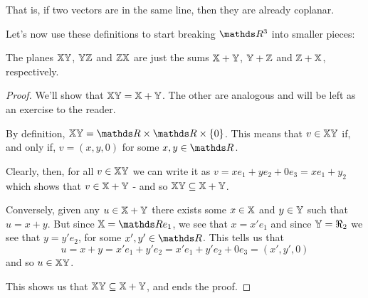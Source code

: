 That is, if two vectors are in the same line, then they are already coplanar.

Let's now use these definitions to start breaking $\R^3$ into smaller pieces:

\begin{lemma}
	The planes $\mathbb{XY}$, $\mathbb{YZ}$ and $\mathbb{ZX}$ are just the sums $\mathbb{X+Y}$, $\mathbb{Y+Z}$ and $\mathbb{Z+X}$, respectively.
\end{lemma}
\begin{proof}
	We'll show that $\mathbb{XY=X+Y}$. The other are analogous and will be left as an exercise to the reader.
	
	By definition, $\mb{XY}=\R\times \R\times \{0\}$. This means that $v\in \mathbb{XY}$ if, and only if, $v=(x,y,0)$ for some $x,y\in \R$.
	
	Clearly, then, for all $v\in \mathbb{XY}$ we can write it as $v=xe_1+ye_2+0e_3=xe_1+y_2$ which shows that $v\in \mathbb{X+Y}$ - and so $\mathbb{XY\subseteq X+Y}$.
	
	\bigskip
	Conversely, given any $u\in \mathbb{X+Y}$ there exists some $x\in \mathbb X$ and $y\in \mathbb Y$ such that $u=x+y$. But since $\mb X=\R e_1$, we see that $x=x'e_1$ and since $\mathbb Y=\Re_2$ we see that $y=y'e_2$, for some $x',y'\in \R$. This tells us that
	\[u=x+y=x'e_1+y'e_2=x'e_1+y'e_2+0e_3=(x',y',0)\]and so $u\in \mathbb{XY}$.
	
	This shows us that $\mathbb{XY}\subseteq \mathbb{X+Y}$, and ends the proof.
\end{proof}

